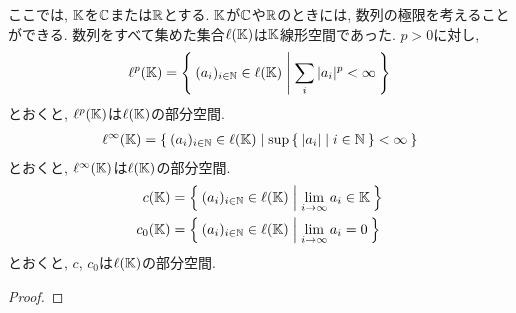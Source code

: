 \begin{example}
  ここでは,
  $\mathbb{K}$を$\mathbb{C}$または$\mathbb{R}$とする.
  $\mathbb{K}$が$\mathbb{C}$や$\mathbb{R}$のときには,
  数列の極限を考えることができる.  
  数列をすべて集めた集合$\ell(\mathbb{K})$は$\mathbb{K}$線形空間であった.
  $p>0$に対し,
  \begin{align*}
    \ell^p(\mathbb{K})=\Set{(a_i)_{i\in\mathbb{N}}\in \ell(\mathbb{K})|\sum_i |a_i|^p < \infty}
  \end{align*}
  とおくと, $\ell^p(\mathbb{K})$は$\ell(\mathbb{K})$の部分空間.
  \begin{align*}
    \ell^\infty(\mathbb{K})=\Set{(a_i)_{i\in\mathbb{N}}\in \ell(\mathbb{K})|\sup \Set{\left|a_i\right||i\in \mathbb{N}} < \infty}
  \end{align*}
  とおくと, $\ell^\infty(\mathbb{K})$は$\ell(\mathbb{K})$の部分空間.
  \begin{align*}
    c(\mathbb{K})&=\Set{(a_i)_{i\in\mathbb{N}} \in \ell(\mathbb{K})| \lim_{i\to\infty} a_i \in\mathbb{K}}\\
    c_0(\mathbb{K})&=\Set{(a_i)_{i\in\mathbb{N}} \in \ell(\mathbb{K})| \lim_{i\to\infty} a_i =0}\\
  \end{align*}
  とおくと, $c$, $c_0$は$\ell(\mathbb{K})$の部分空間.
\end{example}
\begin{proof}\end{proof}

